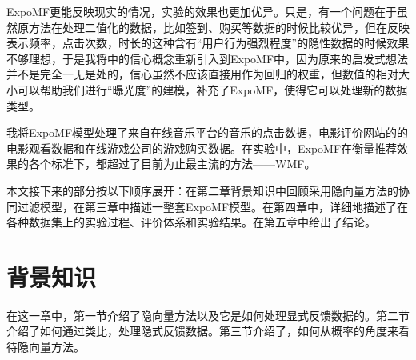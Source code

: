 \documentclass[notitlepage,cs4size,punct,oneside]{ctexrep}
\numberwithin{equation}{chapter}
\theoremstyle{mystyle}
\begin{document}
\par
ExpoMF更能反映现实的情况，实验的效果也更加优异。只是，有一个问题在于虽然原方法在处理二值化的数据，比如签到、购买等数据的时候比较优异，但在反映表示频率，点击次数，时长的这种含有“用户行为强烈程度”的隐性数据的时候效果不够理想，于是我将\cite{WMF}中的信心概念重新引入到ExpoMF中，因为原来的启发式想法并不是完全一无是处的，信心虽然不应该直接用作为回归的权重，但数值的相对大小可以帮助我们进行“曝光度”的建模，补充了ExpoMF，使得它可以处理新的数据类型。
\par
我将ExpoMF模型处理了来自在线音乐平台的音乐的点击数据，电影评价网站的的电影观看数据和在线游戏公司的游戏购买数据。在实验中，ExpoMF在衡量推荐效果的各个标准下，都超过了目前为止最主流的方法——WMF\cite{WMF}。
\par
本文接下来的部分按以下顺序展开：在第二章背景知识中回顾采用隐向量方法的协同过滤模型，在第三章中描述一整套ExpoMF模型。在第四章中，详细地描述了在各种数据集上的实验过程、评价体系和实验结果。在第五章中给出了结论。



\chapter{背景知识}
在这一章中，第一节介绍了隐向量方法以及它是如何处理显式反馈数据的。第二节介绍了如何通过类比，处理隐式反馈数据。第三节介绍了，如何从概率的角度来看待隐向量方法。
\end{document}
